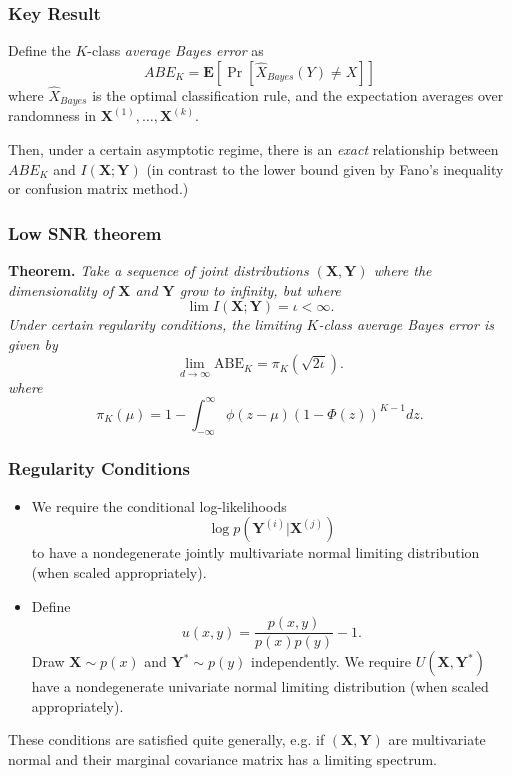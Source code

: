 \documentclass{beamer}
\newcommand{\bX}{\boldsymbol{X}}
\newcommand{\bY}{\boldsymbol{Y}}
\newcommand{\E}{\textbf{E}}
\begin{document}
\begin{frame}
\frametitle{Key Result}
Define the $K$-class \emph{average Bayes error} as
\[
ABE_K = \E[\Pr[\hat{X}_{Bayes}(Y) \neq X]]
\]
where $\hat{X}_{Bayes}$ is the optimal classification rule,
and the expectation averages over randomness in
$\bX^{(1)},\hdots, \bX^{(k)}$.

\vspace{0.3in}

Then, under a certain asymptotic regime,
there is an \emph{exact} relationship between $ABE_K$ and $I(\bX;\bY)$
(in contrast to the lower bound given by Fano's inequality or confusion matrix method.)

\end{frame}







\begin{frame}
\frametitle{Low SNR theorem}

\textbf{Theorem. }\emph{
Take a sequence of joint distributions $(\bX, \bY)$ where
the dimensionality of $\bX$ and $\bY$ grow to infinity,
but where
\[\lim I(\bX; \bY) = \iota < \infty.\]
Under certain regularity conditions, the limiting $K$-class average Bayes error is given by
\[
\lim_{d \to \infty} \text{ABE}_K = \pi_K(\sqrt{2\iota}).
\]
where
\[
\pi_K(\mu) =  1 - \int_{-\infty}^\infty \phi(z-\mu) (1-\Phi(z))^{K-1} dz.
\]
}
\end{frame}

{

}


\begin{frame}
\frametitle{Regularity Conditions}
\begin{itemize}
\item We require the conditional log-likelihoods
\[
\log p(\bY^{(i)}|\bX^{(j)})
\]
to have a nondegenerate jointly multivariate normal limiting distribution (when scaled appropriately).
\item Define
\[
u(x, y) = \frac{p(x, y)}{p(x)p(y)} - 1.
\]
Draw $\bX \sim p(x)$ and $\bY^* \sim p(y)$ independently.
We require $U(\bX, \bY^*)$ have a
nondegenerate univariate normal limiting distribution (when scaled appropriately).
\end{itemize}
These conditions are satisfied quite generally, e.g. if $(\bX, \bY)$ are multivariate normal and their marginal covariance
matrix has a limiting spectrum.
\end{frame}
\end{document}
